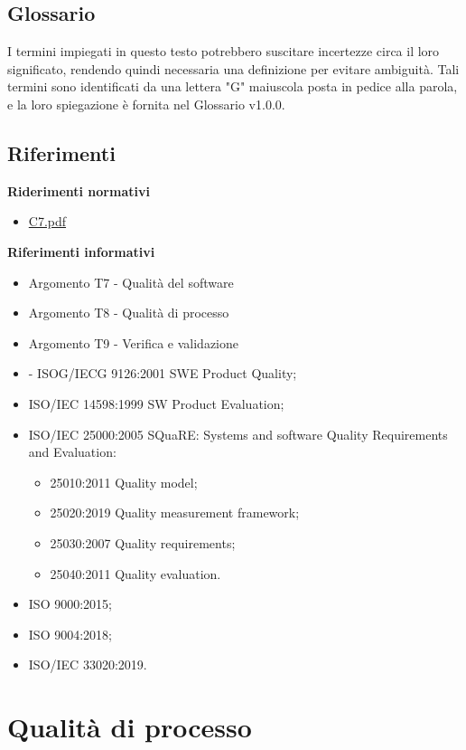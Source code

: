 \documentclass{article}
\begin{document}
\subsection{Glossario}
I termini impiegati in questo testo potrebbero suscitare incertezze circa il loro significato, rendendo quindi necessaria una definizione per evitare ambiguità. Tali termini sono identificati da una lettera "G" maiuscola posta in pedice alla parola, e la loro spiegazione è fornita nel Glossario v1.0.0.

\subsection{Riferimenti}
\textbf{Riderimenti normativi}
\begin{itemize}
    \item \href{https://www.math.unipd.it/~tullio/IS-1/2023/Progetto/C7.pdf}{C7.pdf}
\end{itemize}
\textbf{Riferimenti informativi}
\begin{itemize}
    \item Argomento T7 - Qualità del software
    \item Argomento T8 - Qualità di processo
    \item Argomento T9 - Verifica e validazione
    \item - ISOG/IECG 9126:2001 SWE Product Quality;
    \item ISO/IEC 14598:1999 SW Product Evaluation;
    \item  ISO/IEC 25000:2005 SQuaRE: Systems and software Quality Requirements and Evaluation:
        \begin{itemize}
        \item 25010:2011 Quality model;
        \item 25020:2019 Quality measurement framework;
        \item 25030:2007 Quality requirements;
        \item 25040:2011 Quality evaluation.
    \end{itemize}
    \item ISO 9000:2015;
    \item ISO 9004:2018;
    \item ISO/IEC 33020:2019.
\end{itemize}

\section{Qualità di processo}
\end{document}
